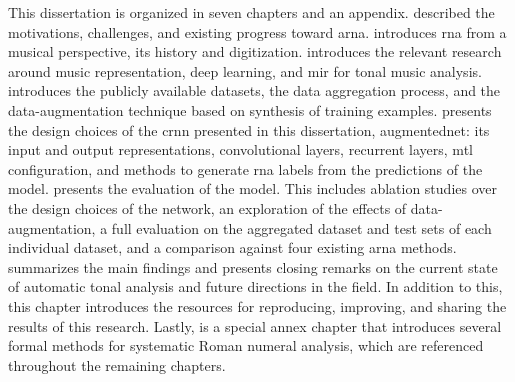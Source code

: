 
This dissertation is organized in seven chapters and an
appendix.  described the motivations,
challenges, and existing progress toward \gls{arna}.
 introduces
\gls{rna} from a musical perspective, its history and
digitization.  introduces the relevant
research around music representation, deep learning, and
\gls{mir} for tonal music analysis.
 introduces the
publicly available datasets, the data aggregation process,
and the data-augmentation technique based on synthesis of
training examples.  presents the design
choices of the \gls{crnn} presented in this dissertation,
\gls{augmentednet}: its input and output representations,
convolutional layers, recurrent layers, \gls{mtl}
configuration, and methods to generate \gls{rna} labels from
the predictions of the model.
 presents the evaluation of
the model. This includes ablation studies over the design
choices of the network, an exploration of the effects of
data-augmentation, a full evaluation on the aggregated
dataset and test sets of each individual dataset, and a
comparison against four existing \gls{arna} methods.
 summarizes the main findings and
presents closing remarks on the current state of automatic
tonal analysis and future directions in the field. In
addition to this, this chapter introduces the resources for
reproducing, improving, and sharing the results of this
research. Lastly,
 is a
special annex chapter that introduces several formal methods
for systematic Roman numeral analysis, which are referenced
throughout the remaining chapters.

